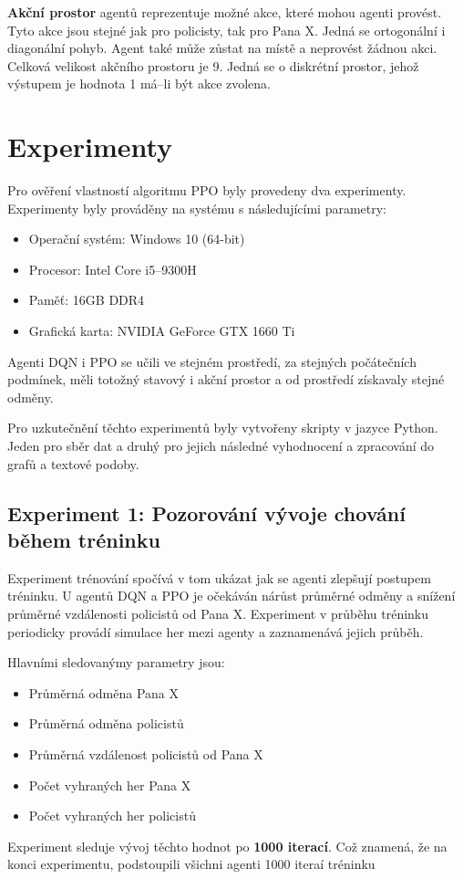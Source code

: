 \bigskip

\textbf{Akční prostor} agentů reprezentuje možné akce, které mohou agenti provést.
Tyto akce jsou stejné jak pro policisty, tak pro Pana X\@.
Jedná se ortogonální i diagonální pohyb.
Agent také může zůstat na místě a neprovést žádnou akci.
Celková velikost akčního prostoru je 9.
Jedná se o diskrétní prostor, jehož výstupem je hodnota 1 má--li být akce zvolena.

\chapter{Experimenty}
\label{ch:experimenty}

Pro ověření vlastností algoritmu PPO byly provedeny dva experimenty.
Experimenty byly prováděny na systému s následujícími parametry:

\begin{itemize}
  \item Operační systém: Windows 10 (64-bit)
  \item Procesor: Intel Core i5--9300H
  \item Paměť: 16GB DDR4
  \item Grafická karta: NVIDIA GeForce GTX 1660 Ti
\end{itemize}

Agenti DQN i PPO se učili ve stejném prostředí, za stejných počátečních podmínek, měli totožný stavový i akční prostor a od prostředí získavaly stejné odměny.

Pro uzkutečnění těchto experimentů byly vytvořeny skripty v jazyce Python.
Jeden pro sběr dat a druhý pro jejich následné vyhodnocení a zpracování do grafů a textové podoby.

\section{Experiment 1: Pozorování vývoje chování během tréninku}
\label{sec:experiment-1}

Experiment trénování spočívá v tom ukázat jak se agenti zlepšují postupem tréninku.
U agentů DQN a PPO je očekáván nárůst průměrné odměny a snížení průměrné vzdálenosti policistů od Pana X\@.
Experiment v průběhu tréninku periodicky provádí simulace her mezi agenty a zaznamenává jejich průběh.

\bigskip
\noindent Hlavními sledovanýmy parametry jsou:
\begin{itemize}
  \item Průměrná odměna Pana X
  \item Průměrná odměna policistů
  \item Průměrná vzdálenost policistů od Pana X
  \item Počet vyhraných her Pana X
  \item Počet vyhraných her policistů
\end{itemize}
Experiment sleduje vývoj těchto hodnot po \textbf{1000 iterací}.
Což znamená, že na konci experimentu, podstoupili všichni agenti 1000 iteraí tréninku


